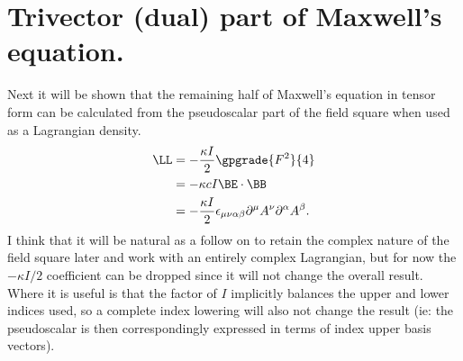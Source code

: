 \section{Trivector (dual) part of Maxwell's equation.}
%
Next it will be shown that the remaining half 
of Maxwell's equation in tensor form can be calculated from the pseudoscalar part of the field square
 when used as a Lagrangian density.
%
\begin{equation}\label{eqn:lagrangianFieldDensity:300}
\begin{aligned}
\LL
&= -\frac{\kappa I}{2} \gpgrade{F^2}{4} \\
&= -{\kappa c I} \BE \cdot \BB \\
&= -\frac{\kappa I}{2}
\epsilon_{\mu\nu\alpha\beta} \partial^{\mu} A^{\nu} \partial^{\alpha} A^{\beta}.
\end{aligned}
\end{equation}
%
I think that it will be natural as a follow on to retain the complex nature of the field square later and work with an entirely complex Lagrangian, but for now
the \(-\kappa I/2\) coefficient can be dropped since it will not change the overall result.  Where it is useful is that the factor of \(I\) implicitly balances the upper and lower indices used, so a complete index lowering will also not change the result (ie: the pseudoscalar is then correspondingly expressed in terms of index upper basis vectors).

